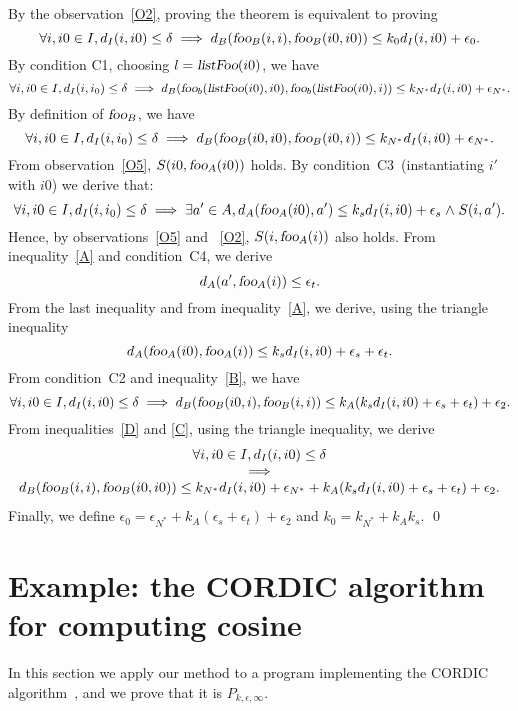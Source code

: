 \documentclass[copyright,creativecommons]{eptcs}
\newcommand{\fooA}{\hbox{\sl foo}_A}
\newcommand{\foob}{\hbox{\sl foo}_b}
\newcommand{\fooB}{\hbox{\sl foo}_B}
\newcommand{\ListFoo}{\hbox{\sl listFoo}}
\newcommand{\Cone}{C1}
\newcommand{\Ctwo}{C2}
\newcommand{\Cthree}{C3}
\newcommand{\Cfour}{C4}
\newcommand{\Kn}{k_{N^*}}
\newcommand{\En}{\epsilon_{N^*}}
\newcommand{\AND}{\mathrel{\wedge}}
\renewenvironment{proof}{\noindent {\bf Proof}\quad}{\qed}
\begin{document}
\begin{proof}
By the observation~\ref{O2}, proving the theorem is equivalent to
proving 
\[\forall i,i0 \in I, d_I(i,i0) \leq \delta \implies
d_B(\fooB(i,i),\fooB(i0,i0)) \leq k_0 d_I(i,i0) + \epsilon_0.\]
By condition \Cone, choosing $l=\ListFoo(i0)$, we have 
\[ \forall i,i0 \in I,d_I(i,i_0) \leq \delta \implies
d_B( \foob(\ListFoo(i0),i0), \foob(\ListFoo(i0),i))\leq \Kn d_I(i,i0) + \En.\]
By definition of $\fooB$, we have
\begin{equation}\label{D}
\forall i,i0 \in I,d_I(i,i_0) \leq \delta \implies
d_B(\fooB(i0,i0),\fooB(i0,i)) \leq \Kn d_I(i,i0) + \En.
\end{equation}
From observation~\ref{O5}, $S(i0,\fooA(i0))$ holds.
By condition~\Cthree \, (instantiating $i'$ with $i0$) we derive that:
\begin{equation}\label{A}
\forall i,i0 \in I,d_I(i,i_0) \leq \delta \implies
\exists a' \in A, d_A(\fooA(i0),a') \leq k_s d_I(i,i0) + \epsilon_s \AND S(i,a').
\end{equation}
Hence, by observations~\ref{O5} and ~\ref{O2}, $S(i,\fooA(i))$ also
holds. From inequality~\eqref{A} and condition~\Cfour, we derive
\begin{equation}
d_A(a',\fooA(i)) \leq \epsilon_t.
\end{equation}
From the last inequality and from  inequality~\eqref{A}, we derive, using
the triangle inequality
\begin{equation}\label{B}
 d_A(\fooA(i0),\fooA(i)) \leq  k_s d_I(i,i0) + \epsilon_s + \epsilon_t.
\end{equation}
From condition~{\Ctwo}  and inequality~\eqref{B}, we have
\begin{equation}\label{C}
\forall i,i0 \in I, d_I(i,i0) \leq \delta \implies
d_B(\fooB(i0,i),\fooB(i,i)) \leq k_A (k_s d_I(i,i0) + \epsilon_s + \epsilon_t) +  \epsilon_2.
\end{equation}
From inequalities~\eqref{D} and \eqref{C}, using the triangle inequality, we derive
\[
\begin{array}{c}\label{eq:E}
\forall i,i0 \in I, d_I(i,i0) \leq \delta \\  \implies   \\
d_B(\fooB(i,i),\fooB(i0,i0)) \leq  \Kn d_I(i,i0) + \En + k_A (k_s d_I(i,i0) + \epsilon_s + \epsilon_t)  + \epsilon_2.
\end{array}
\]
Finally, we define $\epsilon_0= \En + k_A (\epsilon_s + \epsilon_t) +
\epsilon_2$ and $k_0 = \Kn + k_A k_s $.
\end{proof}

\section{Example:  the CORDIC algorithm for computing cosine}\label{sec:cordi}
In this section  we apply our method to a program implementing  the CORDIC algorithm~\cite{volder59}, and we prove that  it is
$P_{k,\epsilon,\infty}$.
\end{document}
